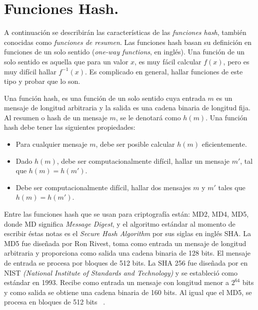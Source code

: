 
\section{Funciones Hash. }
A continuación se describirán las características de las {\it funciones hash}, también conocidas como {\it funciones de resumen}. Las funciones hash basan su definición en funciones de un solo sentido  ({\it one-way functions}, en inglés). Una función de un solo sentido es aquella que para un valor $x$, es  muy fácil calcular $f(x)$, pero es muy difícil hallar $f^{-1}(x)$. Es complicado en general, hallar funciones de este tipo y probar que lo son.
\begin{definition}
Una función hash, es una función de un solo sentido cuya entrada $m$  es un mensaje de longitud arbitraria y la salida es una cadena binaria de longitud fija. Al resumen o hash de un mensaje $m$, se le denotará como $h(m)$. Una función hash debe
tener las siguientes propiedades:
\begin{itemize}
	\item Para cualquier mensaje $m$, debe ser posible calcular $h(m)$ eficientemente. 
	\item Dado $h(m)$, debe ser computacionalmente difícil, hallar un mensaje $m'$, tal que $h(m)=h(m')$.
	\item Debe ser computacionalmente difícil, hallar dos mensajes $m$ y $m'$ tales que $h(m)=h(m')$.
\end{itemize}
\end{definition}
 
Entre las funciones hash que se usan para criptograf\'ia est\'an: MD2, MD4, MD5, donde MD significa {\it Message Digest}, y el algoritmo est\'andar al momento de escribir \'estas notas es el {\it Secure Hash Algorithm} por sus siglas en ingl\'es SHA.
  La MD5 fue dise\~nada por Ron Rivest, toma como entrada un mensaje de longitud arbitraria y proporciona como salida una cadena binaria de 128 bits.
El mensaje de entrada se procesa por bloques de 512 bits.  La SHA 256 fue dise\~nada por en NIST \textit{(National Institute of Standards and Technology)} y se estableci\'o como est\'andar en 1993. Recibe como entrada un mensaje con longitud menor a $2^{64}$ bits y
como salida se obtiene una cadena binaria de 160 bits. Al igual que el MD5, se procesa en bloques de 512 bits ~\cite{modes}.


